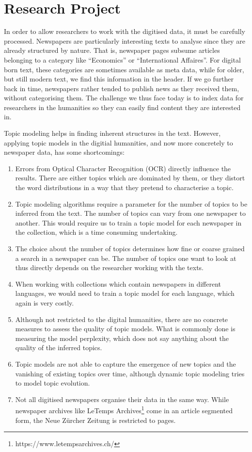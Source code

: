 \section{Research Project}

In order to allow researchers to work with the digitised data, it must be carefully processed. Newspapers are particularly interesting texts to analyse since they are already structured by nature. That is, newspaper pages subsume articles belonging to a category like ``Economics'' or ``International Affaires''. For digital born text, these categories are sometimes available as meta data, while for older, but still modern text, we find this information in the header. If we go further back in time, newspapers rather tended to publish news as they received them, without categorising them. The challenge we thus face today is to index data for researchers in the humanities so they can easily find content they are interested in.

Topic modeling helps in finding inherent structures in the text. However, applying topic models in the digitial humanities, and now more concretely to newspaper data, has some shortcomings: 

\begin{enumerate}
    \item Errors from Optical Character Recognition (OCR) directly influence the results. There are either topics which are dominated by them, or they distort the word distributions in a way that they pretend to characterise a topic.
    \item Topic modeling algorithms require a parameter for the number of topics to be inferred from the text. The number of topics can vary from one newspaper to another. This would require us to train a topic model for each newspaper in the collection, which is a time consuming undertaking.
    \item The choice about the number of topics determines how fine or coarse grained a search in a newspaper can be. The number of topics one want to look at thus directly depends on the researcher working with the texts. 
    \item When working with collections which contain newspapers in different languages, we would need to train a topic model for each language, which again is very costly.
    \item Although not restricted to the digital humanities, there are no concrete measures to assess the quality of topic models. What is commonly done is measuring the model perplexity, which does not say anything about the quality of the inferred topics.
    \item Topic models are not able to capture the emergence of new topics and the vanishing of existing topics over time, although dynamic topic modeling tries to model topic evolution.
    \item Not all digitised newspapers organise their data in the same way. While newspaper archives like LeTemps Archives\footnote{https://www.letempsarchives.ch/} come in an article segmented form, the Neue Zürcher Zeitung is restricted to pages.
\end{enumerate}

